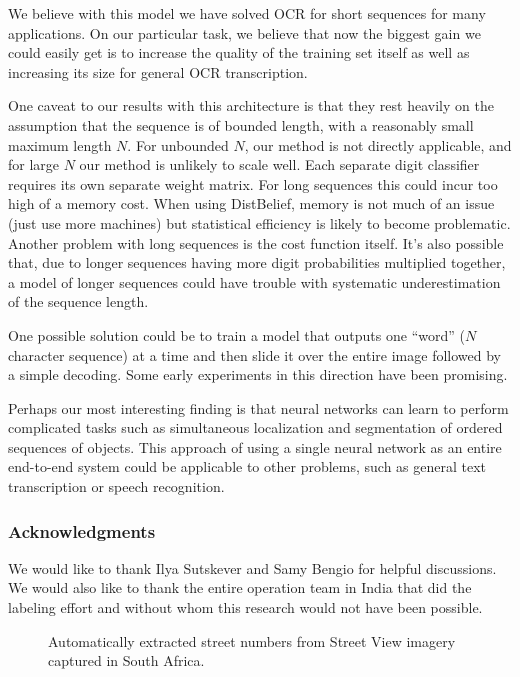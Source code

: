 \documentclass{article} \usepackage{comment}
\begin{document}
We believe with this model we have solved OCR for short sequences for many applications.
On our particular task, we believe that now the biggest gain we could easily get is to
increase the quality of the training set itself as well as increasing its size for general OCR transcription.

One caveat to our results with this architecture is that they rest heavily on the assumption that
the sequence is of bounded length, with a reasonably small maximum length $N$.
For unbounded $N$, our method is not directly applicable, and for large $N$ our
method is unlikely to scale well. Each separate digit classifier requires its own
separate weight matrix. For long sequences this could incur too high of a memory
cost. When using DistBelief, memory is not much of an issue (just use more machines)
but statistical efficiency is likely to become problematic. Another problem with long sequences is the
cost function itself. It's also possible that, due to longer sequences having more
digit probabilities multiplied together, a model of longer sequences could have trouble
with systematic underestimation of the sequence length.

One possible solution could be
to train a model that outputs one ``word'' ($N$ character sequence) at a time and then slide it over
the entire image followed by a simple decoding. Some early experiments in this direction have been
promising.

Perhaps our most interesting finding is that neural networks can learn to perform
complicated tasks such as simultaneous localization and segmentation of ordered
sequences of objects. This approach of using a single
neural network as an entire end-to-end system could be applicable to other problems,
such as general text transcription or speech recognition.

\clearpage

\subsubsection*{Acknowledgments}

We would like to thank Ilya Sutskever and Samy Bengio for helpful discussions.
We would also like to thank the entire operation team in India that did the labeling effort and without whom this research would not have been possible.
\small




\begin{figure}[hb]
\begin{centering}
\caption{Automatically extracted street numbers from Street View imagery captured in South Africa.}
\label{fig:geocoding}
\end{centering}
\end{figure}
\end{document}
